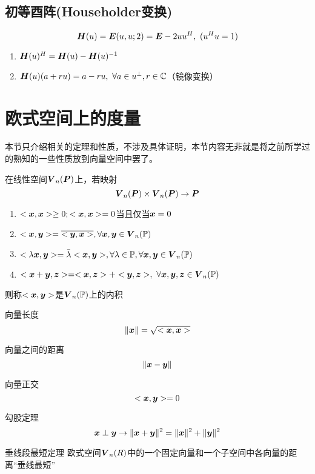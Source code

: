 \documentclass[12pt, a4paper, oneside, UTF8]{ctexbook}
\begin{document}
\subsection{初等酉阵(Householder变换)}
\begin{defn}{}{}
    \[\H(u)=\bs{E}(u,u;2)=\bs{E}-2uu^H,\ (u^Hu=1)\]
    \begin{enumerate}
        \item $\H(u)^H=\H(u)-\H(u)^{-1}$
        \item $\H(u)(a+ru)=a-ru,\ \forall a\in u^{\perp}, r\in\C$（镜像变换）
    \end{enumerate}
\end{defn}
\section{欧式空间上的度量}
本节只介绍相关的定理和性质，不涉及具体证明，本节内容无非就是将之前所学过的熟知的一些性质放到向量空间中罢了。
\begin{defn}{}{}
    在线性空间$\V_n(\P)$上，若映射\[\V_n(\P)\times \V_n(\P)\rightarrow\P\]
    \begin{enumerate}
        \item $<\x,\x>\geq 0;<\x,\x> =0$当且仅当$\x=0$
        \item $<\x,\y>=\overline{<\y,\x>}, \forall \x,\y\in\V_n(\mathbb{P} )$
        \item $<\lambda\x,\y>=\bar{\lambda}<\x,\y>,\forall \lambda\in\mathbb{P}, \forall \x,\y\in\V_n(\mathbb{P} )$
        \item $<\x+\y,\z> =<\x,\z>+<\y,\z>,\ \forall \x,\y,\z\in\V_n(\mathbb{P} )$
    \end{enumerate}
    则称$<\x,\y>$是$\V_n(\mathbb{P} )$上的内积
\end{defn}

\begin{defn}{向量长度}{}
    \[\Vert\x\Vert=\sqrt{<\x,\x>}\]
\end{defn}
\begin{defn}{向量之间的距离}{}
    \[\Vert\x-\y\Vert\]
\end{defn}
\begin{defn}{向量正交}{}
    \[<\x,\y> =0\]
\end{defn}
\begin{defn}{勾股定理}{}
    \[\x\perp\y\rightarrow\Vert\x+\y\Vert^2=\Vert\x\Vert^2+\Vert\y\Vert^2\]
\end{defn}
\begin{them}{垂线段最短定理}{}
    欧式空间$\V_n(R)$中的一个固定向量和一个子空间中各向量的距离“垂线最短”
\end{them}
\end{document}
